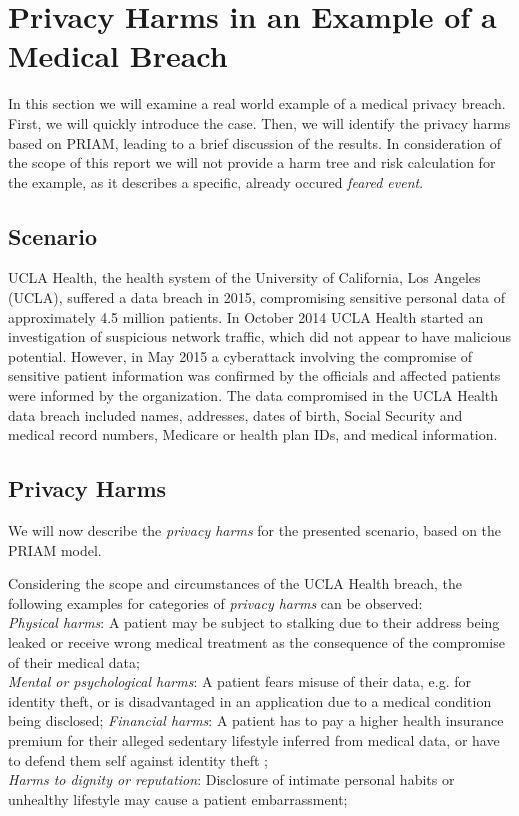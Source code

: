 \section{Privacy Harms in an Example of a Medical Breach}
In this section we will examine a real world example of a medical privacy breach. First, we will quickly introduce the case. Then, we will identify the privacy harms based on PRIAM, leading to a brief discussion of the results.  In consideration of the scope of this report we will not provide a harm tree and risk calculation for the example, as it describes a specific, already occured \textit{feared event}.

\subsection{Scenario}
UCLA Health, the health system of the University of California, Los Angeles (UCLA), suffered a data breach in 2015, compromising sensitive personal data of approximately 4.5 million patients. In October 2014 UCLA Health started an investigation of suspicious network traffic, which did not appear to have malicious potential. However, in May 2015 a cyberattack involving the compromise of sensitive patient information was confirmed by the officials and affected patients were informed by the organization. The data compromised in the UCLA Health data breach included names, addresses, dates of birth, Social Security and medical record numbers, Medicare or health plan IDs, and medical information.\cite{uclahealthbreach}

\subsection{Privacy Harms}
We will now describe the \textit{privacy harms} for the presented scenario, based on the PRIAM model\cite[Section 3.7]{de:hal-01302541}.

Considering the scope and circumstances of the UCLA Health breach, the following examples for categories of \textit{privacy harms} can be observed:\\
\textit{Physical harms}: A patient may be subject to stalking due to their address being leaked or receive wrong medical treatment as the consequence of the compromise of their medical data;\\
\textit{Mental or psychological harms}: A patient fears misuse of their data, e.g. for identity theft, or is disadvantaged in an application due to a medical condition being disclosed;
\textit{Financial harms}: A patient has to pay a higher health insurance premium for their alleged sedentary lifestyle inferred from medical data, or have to defend them self against identity theft ;\\
\textit{Harms to dignity or reputation}: Disclosure of intimate personal habits or unhealthy lifestyle may cause a patient embarrassment;

